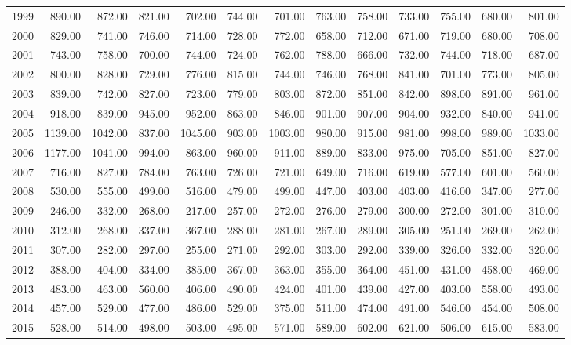 \begin{longtable}{rrrrrrrrrrrrr}
  1999 & 890.00 & 872.00 & 821.00 & 702.00 & 744.00 & 701.00 & 763.00 & 758.00 & 733.00 & 755.00 & 680.00 & 801.00 \\ 
  2000 & 829.00 & 741.00 & 746.00 & 714.00 & 728.00 & 772.00 & 658.00 & 712.00 & 671.00 & 719.00 & 680.00 & 708.00 \\ 
  2001 & 743.00 & 758.00 & 700.00 & 744.00 & 724.00 & 762.00 & 788.00 & 666.00 & 732.00 & 744.00 & 718.00 & 687.00 \\ 
  2002 & 800.00 & 828.00 & 729.00 & 776.00 & 815.00 & 744.00 & 746.00 & 768.00 & 841.00 & 701.00 & 773.00 & 805.00 \\ 
  2003 & 839.00 & 742.00 & 827.00 & 723.00 & 779.00 & 803.00 & 872.00 & 851.00 & 842.00 & 898.00 & 891.00 & 961.00 \\ 
  2004 & 918.00 & 839.00 & 945.00 & 952.00 & 863.00 & 846.00 & 901.00 & 907.00 & 904.00 & 932.00 & 840.00 & 941.00 \\ 
  2005 & 1139.00 & 1042.00 & 837.00 & 1045.00 & 903.00 & 1003.00 & 980.00 & 915.00 & 981.00 & 998.00 & 989.00 & 1033.00 \\ 
  2006 & 1177.00 & 1041.00 & 994.00 & 863.00 & 960.00 & 911.00 & 889.00 & 833.00 & 975.00 & 705.00 & 851.00 & 827.00 \\ 
  2007 & 716.00 & 827.00 & 784.00 & 763.00 & 726.00 & 721.00 & 649.00 & 716.00 & 619.00 & 577.00 & 601.00 & 560.00 \\ 
  2008 & 530.00 & 555.00 & 499.00 & 516.00 & 479.00 & 499.00 & 447.00 & 403.00 & 403.00 & 416.00 & 347.00 & 277.00 \\ 
  2009 & 246.00 & 332.00 & 268.00 & 217.00 & 257.00 & 272.00 & 276.00 & 279.00 & 300.00 & 272.00 & 301.00 & 310.00 \\ 
  2010 & 312.00 & 268.00 & 337.00 & 367.00 & 288.00 & 281.00 & 267.00 & 289.00 & 305.00 & 251.00 & 269.00 & 262.00 \\ 
  2011 & 307.00 & 282.00 & 297.00 & 255.00 & 271.00 & 292.00 & 303.00 & 292.00 & 339.00 & 326.00 & 332.00 & 320.00 \\ 
  2012 & 388.00 & 404.00 & 334.00 & 385.00 & 367.00 & 363.00 & 355.00 & 364.00 & 451.00 & 431.00 & 458.00 & 469.00 \\ 
  2013 & 483.00 & 463.00 & 560.00 & 406.00 & 490.00 & 424.00 & 401.00 & 439.00 & 427.00 & 403.00 & 558.00 & 493.00 \\ 
  2014 & 457.00 & 529.00 & 477.00 & 486.00 & 529.00 & 375.00 & 511.00 & 474.00 & 491.00 & 546.00 & 454.00 & 508.00 \\ 
  2015 & 528.00 & 514.00 & 498.00 & 503.00 & 495.00 & 571.00 & 589.00 & 602.00 & 621.00 & 506.00 & 615.00 & 583.00 \\ 

\end{longtable}
